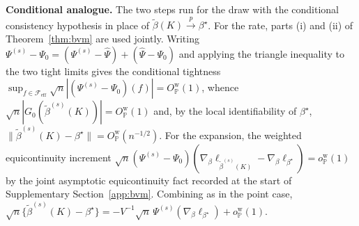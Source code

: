 \documentclass[11pt]{article}
\newcommand{\Pp}{\mathbb P}
\newcommand{\opro}{o_{\Pp}}
\newcommand{\Op}{O_{\Pp}}
\newcommand{\pto}{\overset{p}{\to}}
\newcommand{\calF}{\mathcal F}
\newcommand{\hPsi}{\widehat\Psi}
\newcommand{\norm}[1]{\lVert #1\rVert}
\begin{document}
\textbf{Conditional analogue.} The two steps run for the draw with the conditional consistency hypothesis in place of $\tilde\beta(K)\pto\beta^\star$. For the rate, parts \textup{(i)} and \textup{(ii)} of Theorem~\ref{thm:bvm} are used jointly. Writing $\Psi^{(s)}-\Psi_0=(\Psi^{(s)}-\hPsi)+(\hPsi-\Psi_0)$ and applying the triangle inequality to the two tight limits gives the conditional tightness $\sup_{f\in\calF_{\mathrm{eff}}}\sqrt n|(\Psi^{(s)}-\Psi_0)(f)|=\Op^{\mathrm w}(1)$, whence $\sqrt n|G_0(\tilde\beta^{(s)}(K))|=\Op^{\mathrm w}(1)$ and, by the local identifiability of $\beta^\star$, $\norm{\tilde\beta^{(s)}(K)-\beta^\star}=\Op^{\mathrm w}(n^{-1/2})$. For the expansion, the weighted equicontinuity increment $\sqrt n(\Psi^{(s)}-\Psi_0)(\nabla_\beta\ell_{\tilde\beta^{(s)}(K)}-\nabla_\beta\ell_{\beta^\star})=\opro^{\mathrm w}(1)$ by the joint asymptotic equicontinuity fact recorded at the start of Supplementary Section~\ref{app:bvm}. Combining as in the point case,
$\sqrt n\{\tilde\beta^{(s)}(K)-\beta^\star\}=-V^{-1}\sqrt n\,\Psi^{(s)}(\nabla_\beta\ell_{\beta^\star})+\opro^{\mathrm w}(1)$.
\end{document}
